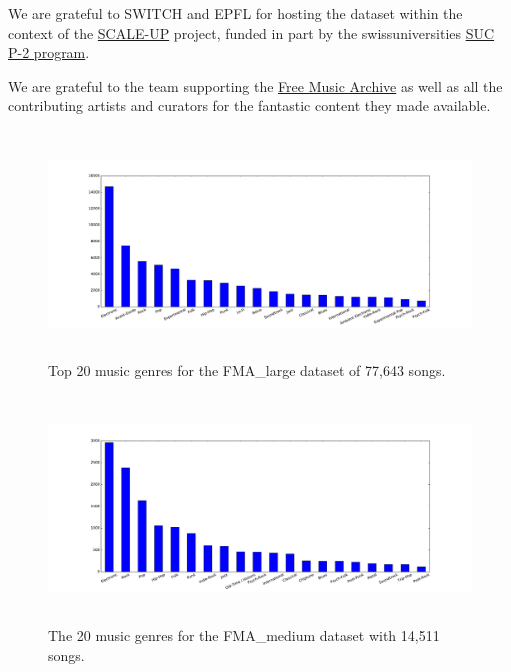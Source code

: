 \documentclass{article}
\begin{document}
We are grateful to SWITCH and EPFL for hosting the dataset within the context
of the \href{https://projects.switch.ch/scale-up/}{SCALE-UP} project, funded in
part by the swissuniversities \href{http://www.swissuniversities.ch/isci}{SUC
P-2 program}.

We are grateful to the team supporting the \href{https://freemusicarchive.org}{Free Music Archive} as well as all the contributing artists and curators for the fantastic content they made available.








\begin{figure}[h!]
\centering
\includegraphics[height=6cm]{histo_large.pdf}
\vspace{-0.5cm}
\caption{Top 20 music genres for the FMA\_large dataset of 77,643 songs.}
\label{fig_large}
\end{figure}






\begin{figure}[h!]
\centering
\includegraphics[height=6cm]{histo_medium.pdf}
\vspace{-0.5cm}
\caption{The 20 music genres for the FMA\_medium dataset with 14,511 songs.}
\label{fig_medium}
\end{figure}
\end{document}

